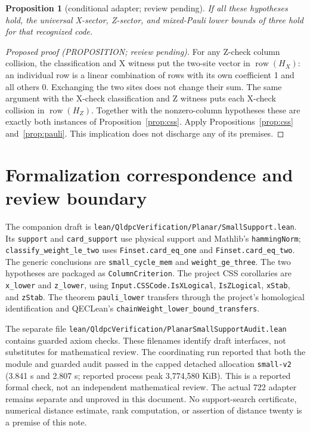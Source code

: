 \documentclass{article}
\newtheorem{proposition}{Proposition}
\DeclareMathOperator{\row}{row}
\begin{document}
\begin{proposition}[conditional adapter; review pending]\label{prop:adapter}
  If all these hypotheses hold, the universal X-sector, Z-sector, and mixed-Pauli lower
  bounds of three hold for that recognized code.
\end{proposition}

\begin{proof}[Proposed proof (PROPOSITION; review pending)]
  For any Z-check column collision, the classification and X witness put the two-site
  vector in \(\row(H_X)\): an individual row is a linear combination of rows with its own
  coefficient 1 and all others 0. Exchanging the two sites does not change their sum. The
  same argument with the X-check classification and Z witness puts each X-check collision
  in \(\row(H_Z)\). Together with the nonzero-column hypotheses these are exactly both
  instances of Proposition~\ref{prop:css}. Apply Propositions~\ref{prop:css}
  and~\ref{prop:pauli}. This implication does not discharge any of its premises.
\end{proof}

\section{Formalization correspondence and review boundary}\label{sec:formalization}

\begin{sloppypar}
The companion draft is
\nolinkurl{lean/QldpcVerification/Planar/SmallSupport.lean}.
Its \texttt{support} and \nolinkurl{card_support} use physical support and Mathlib's
\texttt{hammingNorm}; \nolinkurl{classify_weight_le_two} uses
\nolinkurl{Finset.card_eq_one} and \nolinkurl{Finset.card_eq_two}. The generic conclusions
are \nolinkurl{small_cycle_mem} and \nolinkurl{weight_ge_three}. The two hypotheses are
packaged as \texttt{ColumnCriterion}. The project CSS corollaries are \nolinkurl{x_lower}
and \nolinkurl{z_lower}, using \nolinkurl{Input.CSSCode.IsXLogical}, \texttt{IsZLogical},
\texttt{xStab}, and \texttt{zStab}. The theorem \nolinkurl{pauli_lower} transfers through
the project's homological identification and QECLean's
\nolinkurl{chainWeight_lower_bound_transfers}.
\end{sloppypar}

\begin{sloppypar}
The separate file
\nolinkurl{lean/QldpcVerification/PlanarSmallSupportAudit.lean}
contains guarded axiom checks. These filenames identify draft interfaces, not substitutes
for mathematical review. The coordinating run reported that both the module and guarded
audit passed in the capped detached allocation \texttt{small-v2} (3.841 s and 2.807 s;
reported process peak 3,774,580 KiB). This is a reported formal check, not an independent
mathematical review. The actual 722 adapter remains separate and unproved in this
document. No support-search certificate, numerical distance estimate, rank computation, or
assertion of distance twenty is a premise of this note.
\end{sloppypar}
\end{document}
